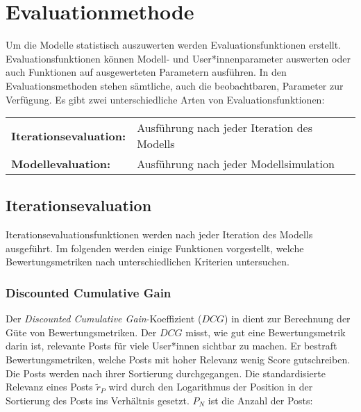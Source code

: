\chapter{Evaluationmethode}
\label{chap:evaluationsmethode}

Um die Modelle statistisch auszuwerten werden Evaluationsfunktionen erstellt. Evaluationsfunktionen können Modell-  und User*innenparameter auswerten oder auch Funktionen auf ausgewerteten Parametern ausführen. In den Evaluationsmethoden stehen sämtliche, auch die beobachtbaren, Parameter zur Verfügung.
Es gibt zwei unterschiedliche Arten von Evaluationsfunktionen:

\begin{table}[!htbp]
	\begin{tabularx}{\textwidth}{lX}
		\textbf{Iterationsevaluation:} &  Ausführung nach jeder Iteration des Modells\\
		\textbf{Modellevaluation:} & Ausführung nach jeder Modellsimulation  \\
	\end{tabularx}
\end{table}

\section{Iterationsevaluation}
\label{sec:evaluationsfunktionen}

Iterationsevaluationsfunktionen werden nach jeder Iteration des Modells ausgeführt. Im folgenden werden einige Funktionen vorgestellt, welche Bewertungsmetriken nach unterschiedlichen Kriterien untersuchen.

\subsection{Discounted Cumulative Gain}

Der \textit{Discounted Cumulative Gain}-Koeffizient ($DCG$) in \cite{Biega2018405} dient zur Berechnung der Güte von Bewertungsmetriken. Der $DCG$ misst, wie gut eine Bewertungsmetrik darin ist, relevante Posts für viele User*innen sichtbar zu machen. Er bestraft Bewertungsmetriken, welche Posts mit hoher Relevanz wenig Score gutschreiben. Die Posts werden nach ihrer Sortierung durchgegangen. Die standardisierte Relevanz eines Posts ${\tilde{r}}_{P}$ wird durch den Logarithmus der Position in der Sortierung des Posts ins Verhältnis gesetzt. $P_N$ ist die Anzahl der Posts:

